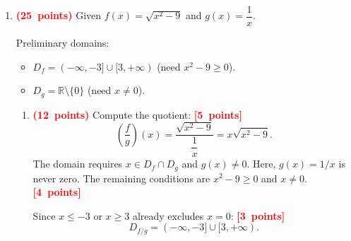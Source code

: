 \documentclass[12pt,a4paper]{article}
\newcommand{\R}{\mathbb{R}}
\newcommand{\bobot}[1]{\mbox{\textcolor{red}{\textbf{(#1 points)}}}}
\newcommand{\poin}[1]{\mbox{\textcolor{red}{\textbf{[#1 points]}}}}
\begin{document}
\begin{enumerate}
        Substituting (1) into (2) and solving for $a$: \poin{6}
        \begin{align*}
          4(2a + 4) & = 3a + 11, \\
          8a + 16   & = 3a + 11, \\
          5a        & = -5,      \\
          a         & = -1.
        \end{align*}
        Substitute $a=-1$ into (1): \poin{4}
        \[
          b = 2(-1) + 4 = 2.
        \]
        Therefore, the required coordinate is: \poin{3}
        \[
          \boxed{(a, b) = (-1,\; 2).}
        \]

        \begin{samepage}
          \textit{Verification:}
          \begin{itemize}
            \item Gradient $(-2,0)\to(-1,2)$: $\dfrac{2}{1} = 2$. \checkmark
            \item Gradient $(3,5)\to(-1,2)$: $\dfrac{-3}{-4} = \dfrac{3}{4}$. \checkmark
          \end{itemize}
        \end{samepage}

  \item \bobot{25} Given $f(x)=\sqrt{x^2-9}$ and $g(x)=\dfrac{1}{x}$.

        Preliminary domains:
        \begin{itemize}
          \item $D_f = (-\infty,-3]\cup[3,+\infty)$ (need $x^2-9\ge0$).
          \item $D_g = \R\setminus\{0\}$ (need $x\ne0$).
        \end{itemize}

        \begin{enumerate}
          \item \bobot{12} Compute the quotient: \poin{5}
                \[
                  \left(\frac{f}{g}\right)(x)
                  = \frac{\sqrt{x^2-9}}{\dfrac{1}{x}}
                  = x\sqrt{x^2-9}.
                \]
                The domain requires $x\in D_f\cap D_g$ and $g(x)\ne0$.
                Here, $g(x)=1/x$ is never zero.
                The remaining conditions are $x^2-9\ge0$ and $x\ne0$. \poin{4}

                Since $x\le-3$ or $x\ge3$ already excludes $x=0$: \poin{3}
                \[
                  \boxed{D_{f/g} = (-\infty,-3]\cup[3,+\infty).}
                \]


\end{enumerate}
\end{enumerate}
\end{document}
